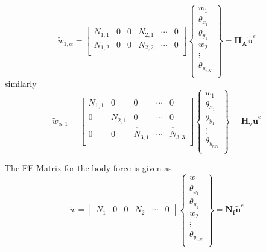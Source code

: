 \documentclass[9pt]{beamer}
\begin{document}
\begin{frame}

\begin{equation*}
\tilde{w}_{1, \alpha} = 
\begin{bmatrix}
{N}_{1,1} & 0 & 0 &{N}_{2,1} & \cdots & 0 \\
{N}_{1,2} & 0 & 0 &{N}_{2,2} & \cdots & 0 \\ 
\end{bmatrix} 
\left\{
\begin{array}{r}
w_1 \\
\theta_{x_1} \\
\theta_{y_1} \\
w_{2} \\
\vdots \\
\theta_{y_{nN}} \\
\end{array} \right\}=\mathbf{ H_A }\tilde{\mathbf{u}}^e
\end{equation*}
similarly
\begin{equation*}
\tilde{w}_{\alpha, 1} = 
\begin{bmatrix}
{N}_{1,1} & 0 & 0 & \cdots & 0 \\
0 & \overline{N}_{2,1} & 0 & \cdots & 0 \\ 
0 & 0 & \overline{\overline{N}}_{3,1} & \cdots & \overline{\overline{N}}_{3,3} \\ 
\end{bmatrix} 
\left\{
\begin{array}{r}
w_1 \\
\theta_{x_1} \\
\theta_{y_1} \\
\vdots \\
\theta_{y_{nN}} \\
\end{array} \right\}=\mathbf{ H_v }\tilde{\mathbf{u}}^e
\end{equation*}

\end{frame}

\begin{frame}

The FE Matrix for the body force is given as
\begin{equation*}
\tilde{w} = 
\begin{bmatrix}
{N}_{1} & 0 & 0 &{N}_{2} &\cdots & 0 
\end{bmatrix} 
\left\{
\begin{array}{r}
w_1 \\
\theta_{x_1} \\
\theta_{y_1} \\
w_2 \\
\vdots \\
\theta_{y_{nN}} \\
\end{array} \right\}=\mathbf{ N_f }\tilde{\mathbf{u}}^e
\end{equation*}
\end{frame}
\end{document}

